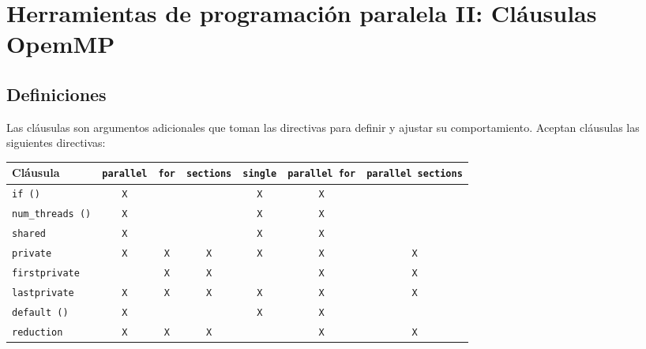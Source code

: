 \chapter{Herramientas de programación paralela II\@: Cláusulas OpemMP}\label{clausulas-openmp}

\section{Definiciones}\label{clausulas-openmp-definiciones}

Las cláusulas son argumentos adicionales que toman las directivas para definir y ajustar su comportamiento.
Aceptan cláusulas las siguientes directivas:

\begin{table}[!h]
\begin{center}
\begin{tabular}{l c c c c c c}
\textbf{Cláusula}           & \texttt{parallel} & \texttt{for} & \texttt{sections} & \texttt{single} & \texttt{parallel for} & \texttt{parallel sections} \\
	\toprule
	\texttt{if ()}           & \texttt{X}        &              &                   & \texttt{X}      & \texttt{X}            &                            \\
	\texttt{num\_threads ()} & \texttt{X}        &              &                   & \texttt{X}      & \texttt{X}            &                            \\
	\texttt{shared}          & \texttt{X}        &              &                   & \texttt{X}      & \texttt{X}            &                            \\
	\texttt{private}         & \texttt{X}        & \texttt{X}   & \texttt{X}        & \texttt{X}      & \texttt{X}            & \texttt{X}                 \\
	\texttt{firstprivate}    &                   & \texttt{X}   & \texttt{X}        &                 & \texttt{X}            & \texttt{X}                 \\
	\texttt{lastprivate}     & \texttt{X}        & \texttt{X}   & \texttt{X}        & \texttt{X}      & \texttt{X}            & \texttt{X}                 \\
	\texttt{default ()}      & \texttt{X}        &              &                   & \texttt{X}      & \texttt{X}            &                            \\
	\texttt{reduction}       & \texttt{X}        & \texttt{X}   & \texttt{X}        &                 & \texttt{X}            & \texttt{X}                 \\

\end{tabular}
\end{center}
\end{table}

